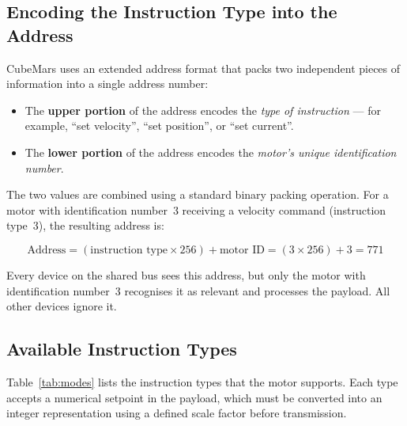 \documentclass[12pt,a4paper]{article}
\begin{document}
\subsection{Encoding the Instruction Type into the Address}

CubeMars uses an extended address format that packs two independent pieces
of information into a single address number:

\begin{itemize}
  \item The \textbf{upper portion} of the address encodes the
        \emph{type of instruction} --- for example, ``set velocity'',
        ``set position'', or ``set current''.
  \item The \textbf{lower portion} of the address encodes the
        \emph{motor's unique identification number}.
\end{itemize}

The two values are combined using a standard binary packing operation.
For a motor with identification number~3 receiving a velocity command
(instruction type~3), the resulting address is:

\begin{equation}
  \text{Address} = (\text{instruction type} \times 256) + \text{motor ID}
  = (3 \times 256) + 3 = 771
\end{equation}

Every device on the shared bus sees this address, but only the motor with
identification number~3 recognises it as relevant and processes the payload.
All other devices ignore it.

\subsection{Available Instruction Types}

Table~\ref{tab:modes} lists the instruction types that the motor supports.
Each type accepts a numerical setpoint in the payload, which must be
converted into an integer representation using a defined scale factor
before transmission.
\end{document}
